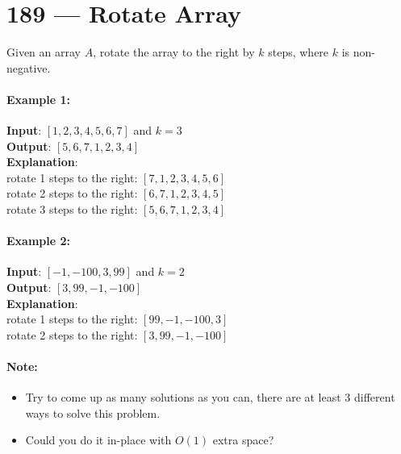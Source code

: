 \section{189 --- Rotate Array}
Given an array $A$, rotate the array to the right by $k$ steps, where $k$ is non-negative.
\paragraph{Example 1:}
\begin{flushleft}
\textbf{Input}: $[1,2,3,4,5,6,7]$ and $k = 3$
\\
\textbf{Output}: $[5,6,7,1,2,3,4]$
\\
\textbf{Explanation}:
\\
rotate 1 steps to the right: $[7,1,2,3,4,5,6]$
\\
rotate 2 steps to the right: $[6,7,1,2,3,4,5]$
\\
rotate 3 steps to the right: $[5,6,7,1,2,3,4]$
\end{flushleft}
\paragraph{Example 2:}
\begin{flushleft}
\textbf{Input}: $[-1,-100,3,99]$ and $k = 2$
\\
\textbf{Output}: $[3,99,-1,-100]$
\\
\textbf{Explanation}:
\\
rotate 1 steps to the right: $[99,-1,-100,3]$
\\
rotate 2 steps to the right: $[3,99,-1,-100]$
\end{flushleft}
\paragraph{Note:}
\begin{itemize}
\item Try to come up as many solutions as you can, there are at least 3 different ways to solve this problem.
\item Could you do it in-place with $O(1)$ extra space?
\end{itemize}
